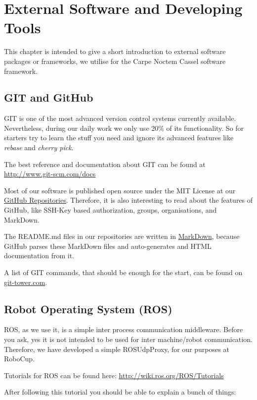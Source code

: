\chapter{External Software and Developing Tools}
\label{chap:ExtSoftware}

This chapter is intended to give a short introduction to external software packages or frameworks, we utilise for the Carpe Noctem Cassel software framework.

\section{GIT and GitHub}
\label{sec:Git}

GIT is one of the most advanced version control systems currently available. Nevertheless, during our daily work we only use 20\% of its functionality. So for starters try to learn the stuff you need and ignore its advanced features like \emph{rebase} and \emph{cherry pick}.

The best reference and documentation about GIT can be found at \url{http://www.git-scm.com/docs}

Most of our software is published open source under the MIT License at our \href{https://github.com/carpe-noctem-cassel}{GitHub Repositories}. Therefore, it is also interesting to read about the features of GitHub, like SSH-Key based authorization, groups, organisations, and MarkDown.

The README.md files in our repositories are written in \href{https://en.wikipedia.org/wiki/Markdown}{MarkDown}, because GitHub parses these MarkDown files and auto-generates and HTML documentation from it.

A list of GIT commands, that should be enough for the start, can be found on \href{https://www.git-tower.com/blog/git-cheat-sheet/}{git-tower.com}.

\section{Robot Operating System (ROS)}
\label{sec:ROS}

ROS, as we use it, is a simple inter process communication middleware. Before you ask, yes it is not intended to be used for inter machine/robot communication. Therefore, we have developed a simple ROSUdpProxy, for our purposes at RoboCup. 

Tutorials for ROS can be found here: \url{http://wiki.ros.org/ROS/Tutorials}

After following this tutorial you should be able to explain a bunch of things:

